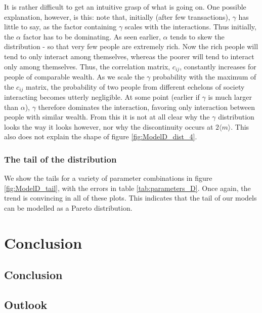\documentclass[a4paper, 10pt]{article}
\begin{document}
\linebreak
It is rather difficult to get an intuitive grasp of what is going on. One possible explanation, however, is this: note that, initially (after few transactions), $\gamma$ has little to say, as the factor containing $\gamma$ scales with the interactions. Thus initially, the $\alpha$ factor has to be dominating. As seen earlier, $\alpha$ tends to skew the distribution - so that very few people are extremely rich. Now the rich people will tend to only interact among themselves, whereas the poorer will tend to interact only among themselves. Thus, the correlation matrix, $c_{ij}$, constantly increases for people of comparable wealth. As we scale the $\gamma$ probability with the maximum of the $c_{ij}$ matrix, the probability of two people from different echelons of society interacting becomes utterly negligible. At some point (earlier if $\gamma$ is much larger than $\alpha$), $\gamma$ therefore dominates the interaction, favoring only interaction between people with similar wealth. From this it is not at all clear why the $\gamma$ distribution looks the way it looks however, nor why the discontinuity occurs at $2\langle m \rangle$. This also does not explain the shape of figure \ref{fig:ModelD_dist_4}.
\subsubsection{The tail of the distribution}
We show the tails for a variety of parameter combinations in figure \ref{fig:ModelD_tail}, with the errors in table \ref{tab:parameters_D}. Once again, the trend is convincing in all of these plots. This indicates that the tail of our models can be modelled as a Pareto distribution.  
\section{Conclusion}
\subsection{Conclusion}
\subsection{Outlook}


\end{document}
